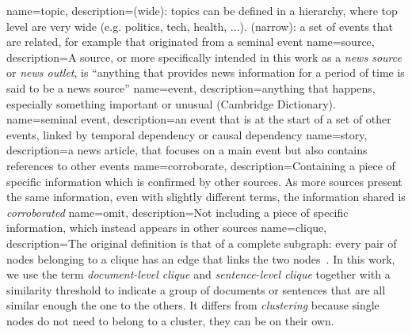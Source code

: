 {
        name=topic,
        description={(wide): topics can be defined in a hierarchy, where top level are very wide (e.g. politics, tech, health, ...).
        (narrow): a set of events that are related, for example that originated from a seminal event}
}
{
        name=source,
        description={A source, or more specifically intended in this work as a \emph{news source} or \emph{news outlet}, is ``anything that provides news information for a period of time is said to be a news source''}
}
{
        name=event,
        description={anything that happens, especially something important or unusual (Cambridge Dictionary). }
}
{
        name=seminal event,
        description={an event that is at the start of a set of other events, linked by temporal dependency or causal dependency}
}
{
        name=story,
        description={a news article, that focuses on a main event but also contains references to other events}
}
{
        name=corroborate,
        description={Containing a piece of specific information which is confirmed by other sources. As more sources present the same information, even with slightly different terms, the information shared is \emph{corroborated}}
}
{
        name=omit,
        description={Not including a piece of specific information, which instead appears in other sources}
}
{
        name=clique,
        description={The original definition is that of a complete subgraph: every pair of nodes belonging to a clique has an edge that links the two nodes~\citep{luce1949method}. In this work, we use the term \emph{document-level clique} and \emph{sentence-level clique} together with a similarity threshold to indicate a group of documents or sentences that are all similar enough the one to the others. It differs from \emph{clustering} because single nodes do not need to belong to a cluster, they can be on their own.}
}
